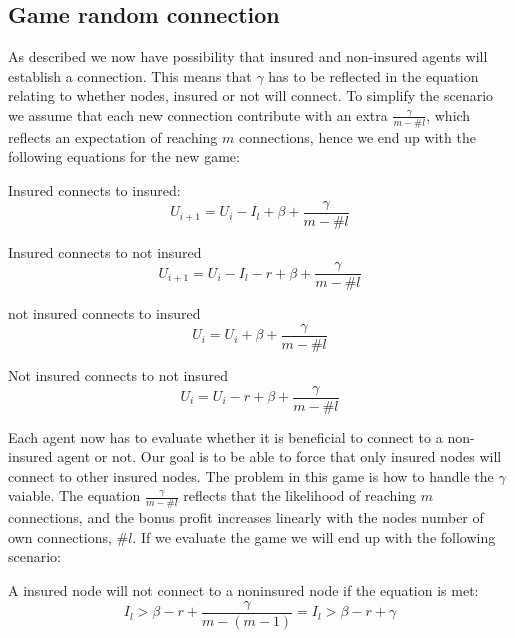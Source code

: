 \subsection{Game random connection}
As described we now have possibility that insured and non-insured agents will establish a connection. This means that $\gamma$ has to be reflected in the equation relating to whether nodes, insured or not will connect. To simplify the scenario we assume that each new connection contribute with an extra $\frac{\gamma}{ m-\#l}$, which reflects an expectation of reaching $m$ connections, hence we end up with the following equations for the new game:

Insured connects to insured:
\begin{equation}
U_{i+1}=U_{i} - I_{l} + \beta + \frac{\gamma}{ m-\#l}
\label{eq:insured-insured2}
\end{equation}

Insured connects to not insured
\begin{equation}
U_{i+1}=U_{i} - I_{l} - r + \beta + \frac{\gamma}{ m-\#l}
\label{eq:insured-noninsured}
\end{equation}

not insured connects to insured
\begin{equation}
U_{i}=U_{i}  + \beta + \frac{\gamma}{ m-\#l}
\label{eq:noninsured-insured}
\end{equation}

Not insured connects to not insured
\begin{equation}
U_{i}=U_{i} - r + \beta + \frac{\gamma}{ m-\#l}
\label{eq:noninsured-noninsured}
\end{equation}



Each agent now has to evaluate whether it is beneficial to connect to a non-insured agent or not. Our goal is to be able to force that only insured nodes will connect to other insured nodes. The problem in this game is how to handle the $\gamma $vaiable. 
The equation $\frac{\gamma}{ m-\#l}$ reflects that the likelihood of reaching $m$ connections, and the bonus profit increases linearly with the nodes number of own connections, $\#l$. If we evaluate the game we will end up with the following scenario: 

A insured node will not connect to a noninsured node if the equation is met:
\begin{equation}
I_{l} > \beta - r + \frac{\gamma}{ m-(m-1)}   =    I_{l} > \beta - r + \gamma
\label{eq:solutionToBlockNonInsured2}
\end{equation}

